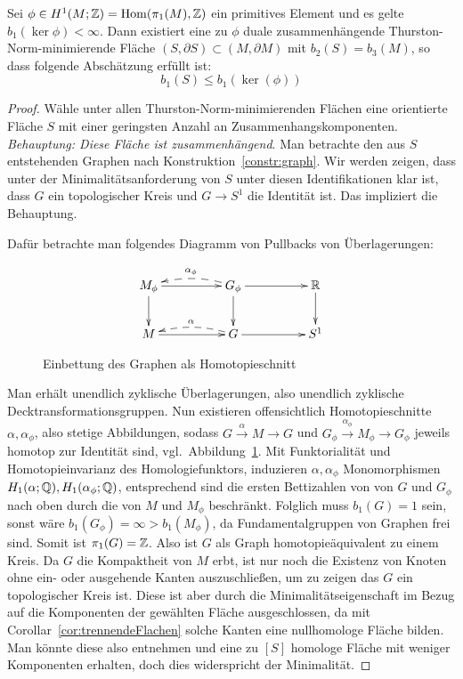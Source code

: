 \begin{lem}
	\label{lem:minS}
	Sei $\phi \in H^1(M;\mathbb{Z})= \operatorname{Hom} (\pi_1(M),\mathbb{Z})$ ein primitives Element und es gelte $b_1(\ker\phi)<\infty$. Dann existiert eine zu $\phi$ duale zusammenhängende Thurston-Norm-minimierende Fläche $(S,\partial S) \subset (M,\partial M)$ mit $b_2(S)=b_3(M)$, so dass folgende Abschätzung erfüllt ist:
	\[
	b_1(S) \leq b_1(\ker(\phi))
	\]
\end{lem}
\begin{proof}
	Wähle unter allen Thurston-Norm-minimierenden Flächen eine orientierte Fläche $S$ mit einer geringsten Anzahl an Zusammenhangskomponenten.\\
	\textit{Behauptung: Diese Fläche ist zusammenhängend}.
	Man betrachte den aus $S$ entstehenden Graphen nach Konstruktion~\ref{constr:graph}.
	Wir werden zeigen, dass unter der Minimalitätsanforderung von $S$ unter diesen Identifikationen klar ist, dass $G$ ein topologischer Kreis und $G\to S^1$ die Identität ist. Das impliziert die Behauptung.

	Dafür betrachte man folgendes Diagramm von Pullbacks von Überlagerungen:

	\[
	 	\begin{xy}
	 		\xymatrixcolsep{4pc}\xymatrix{
	 			M_\phi \ar[r] \ar[d] & G_\phi \ar[d] \ar@{-->}@/_/[l]_{\alpha_\phi} \ar[r] & \RR \ar[d]\\
	 			M \ar[r] & G \ar@{-->}@/_/[l]_\alpha \ar[r] &S^1
	 		}
	 	\end{xy}
	 \] 
	 \begin{figure}
	 \centering
	 	
	 	\caption{Einbettung des Graphen als Homotopieschnitt}
	 	\label{fig:homotopysection}
	 \end{figure}
	 Man erhält unendlich zyklische Überlagerungen, also unendlich zyklische Decktransformationsgruppen. Nun existieren offensichtlich Homotopieschnitte $\alpha, \alpha_\phi$, also stetige Abbildungen, sodass $ G \stackrel \alpha \to M \to G$ und $ G_\phi \stackrel {\alpha_ \phi} \to M_\phi \to G_\phi$ jeweils homotop zur Identität sind, vgl.\ Abbildung~\ref{fig:homotopysection}. Mit Funktorialität und Homotopieinvarianz des Homologiefunktors, induzieren $\alpha,\alpha_\phi$ Monomorphismen $H_1(\alpha;\mathbb{Q}),H_1(\alpha_\phi;\mathbb{Q})$, entsprechend sind die ersten Bettizahlen von von $G$ und $G_\phi$ nach oben durch die von $M$ und $M_\phi$ beschränkt. Folglich muss $b_1(G)=1$ sein, sonst wäre $b_1(G_\phi)=\infty> b_1(M_\phi)$, da Fundamentalgruppen von Graphen frei sind. Somit ist $\pi_1(G)= \mathbb{Z}$. Also ist $G$ als Graph homotopieäquivalent zu einem Kreis. Da $G$ die Kompaktheit von $M$ erbt, ist nur noch die Existenz von Knoten ohne ein- oder ausgehende Kanten auszuschließen, um zu zeigen das $G$ ein topologischer Kreis ist. Diese ist aber durch die Minimalitätseigenschaft im Bezug auf die Komponenten der gewählten Fläche ausgeschlossen, da mit Corollar~\ref{cor:trennendeFlachen} solche Kanten eine nullhomologe Fläche bilden. Man könnte diese also entnehmen und eine zu $[S]$ homologe Fläche mit weniger Komponenten erhalten, doch dies widerspricht der Minimalität.


\end{proof}
